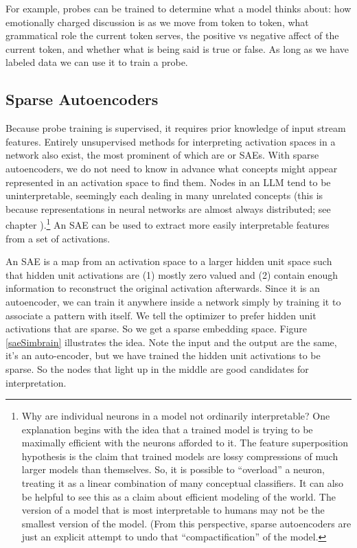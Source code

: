 For example, probes can be trained to determine what a model thinks about: how
emotionally charged discussion is as we move from token to token, what
grammatical role the current token serves, the positive vs negative affect of
the current token, and whether what is being said is true or false. As long as
we have labeled data we can use it to train a probe.

\subsection{Sparse Autoencoders}

Because probe training is supervised, it requires prior knowledge of input
stream features. Entirely unsupervised methods for interpreting activation
spaces in a network also exist, the most prominent of which are
 or SAEs. With sparse autoencoders, we do not
need to know in advance what concepts might appear represented in an activation
space to find them. Nodes in an LLM tend to be uninterpretable, seemingly each
dealing in many unrelated concepts (this is because representations in neural
networks are almost always distributed; see chapter
).\footnote{Why are individual neurons in a model not
ordinarily interpretable? One explanation begins with the idea that a trained
model is trying to be maximally efficient with the neurons afforded to it. The
feature superposition hypothesis is the claim that trained models are lossy
compressions of much larger models than themselves. So, it is possible to
``overload'' a neuron, treating it as a linear combination of many conceptual
classifiers. It can also be helpful to see this as a claim about efficient
modeling of the world. The version of a model that is most interpretable to
humans may not be the smallest version of the model. (From this perspective,
sparse autoencoders are just an explicit attempt to undo that
``compactification'' of the model.}   An SAE can be used to extract more easily
interpretable features from a set of activations. 

An SAE is a map from an activation space to a larger hidden unit space such
that hidden unit activations are (1) mostly zero valued and (2) contain enough
information to reconstruct the original activation afterwards.  Since it is an
autoencoder, we can train it anywhere inside a network simply by training it to
associate a pattern with itself. We tell the optimizer to prefer hidden unit
activations that are sparse.  So we get a sparse embedding space. Figure
\ref{saeSimbrain} illustrates the idea. Note the input and the output are the
same, it's an auto-encoder, but we have trained the hidden unit activations to
be sparse. So the nodes that light up in the middle are good candidates for
interpretation.

